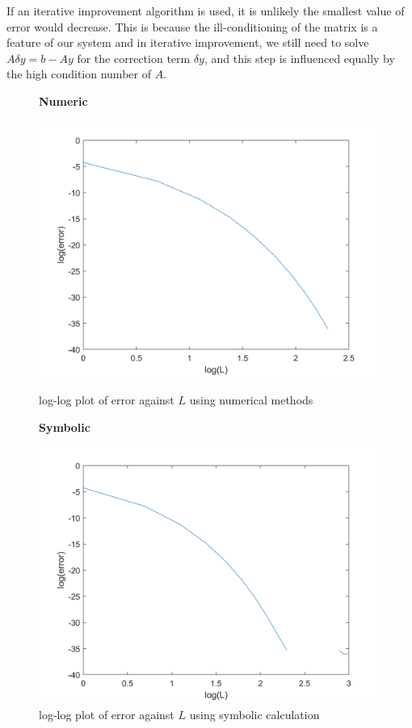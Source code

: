 \documentclass[10pt]{article}
\begin{document}
If an iterative improvement algorithm is used, it is unlikely the smallest value of error would decrease. This is because the ill-conditioning of the matrix is a feature of our system and in iterative improvement, we still need to solve $A\delta y = b-Ay$ for the correction term $\delta y$, and this step is influenced equally by the high condition number of $A$.\\ 
\begin{figure}[H]
    \begin{minipage}[b]{0.47\linewidth}
            \centering
            \textbf{Numeric}\par
            \includegraphics[width=\textwidth]{Files/q2,L=11.png}
            \caption{log-log plot of error against $L$ using numerical methods}
        \end{minipage}
        \hfill
    \begin{minipage}[b]{0.47\linewidth}
            \centering
            \textbf{Symbolic}\par
            \includegraphics[width=\textwidth]{Files/q2,L=20.png}
            \caption{log-log plot of error against $L$ using symbolic calculation}
        \end{minipage}
\end{figure}
\end{document}
